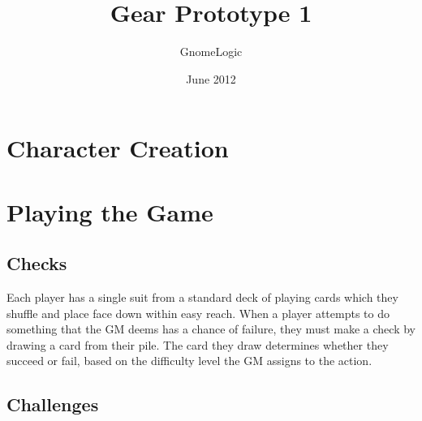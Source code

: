 \documentclass{book}
\begin{document}
\title{Gear Prototype 1}
\author{GnomeLogic}
\date{June 2012}
\maketitle

\chapter{Character Creation}

\chapter{Playing the Game}
\section{Checks}
Each player has a single suit from a standard deck of playing cards which they shuffle and place face down within easy reach. When a player attempts to do something that the
GM deems has a chance of failure, they must make a check by drawing a card from their pile. The card they draw determines whether they succeed or fail, based on the difficulty
level the GM assigns to the action.
\section{Challenges}
\end{document}
